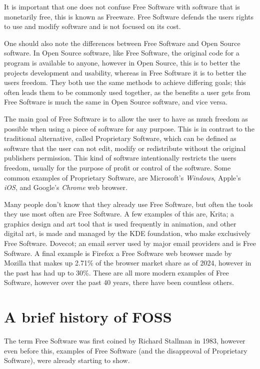 \documentclass[a4paper,12pt]{article}
\begin{document}
{It is important that one does not confuse Free Software with software that is monetarily free, this is known as
Freeware. Free Software defends the users rights to use and modify software and is not focused on its cost.

One should also note the differences between Free Software and Open Source software. In Open Source software,
like Free Software, the original code for a program is available to anyone, however in Open Source, this is to
better the projects development and usability, whereas in Free Software it is to better the users freedom. They
both use the same methods to achieve differing goals; this often leads them to be commonly used together, as the
benefits a user gets from Free Software is much the same in Open Source software, and vice versa.

The main goal of Free Software is to allow the user to have as much freedom as possible when using a piece of
software for any purpose. This is in contrast to the traditional alternative, called Proprietary Software, which
can be defined as software that the user can not edit, modify or redistribute without the original publishers
permission. This kind of software intentionally restricts the users freedom, usually for the purpose of profit or
control of the software. Some common examples of Proprietary Software, are Microsoft's \textit{Windows}, Apple's
\textit{iOS}, and Google's \textit{Chrome} web browser.

Many people don't know that they already use Free Software\cite{COMMONfoss}, but often the tools they use most
often are Free Software. A few examples of this are, Krita\cite{KRITA}; a graphics design and art tool that is
used frequently in animation, and other digital art, is made and managed by the KDE foundation\cite{KDE}, who
make exclusively Free Software. Dovecot\cite{DOVECOT}; an email server used by major email providers and is Free
Software. A final example is Firefox\cite{FIREFOX} a Free Software web browser made by Mozilla that makes up 2.71\%
of the browser market share as of 2024, however in the past has had up to 30\%\cite{BROWSERmarketshare}. These
are all more modern examples of Free Software, however over the past 40 years, there have been countless others.

\section{A brief history of FOSS} The term Free Software was first coined by Richard Stallman in 1983\cite{GNUproject},
however even before this, examples of Free Software (and the disapproval of Proprietary Software), were already
starting to show.

}
\end{document}
